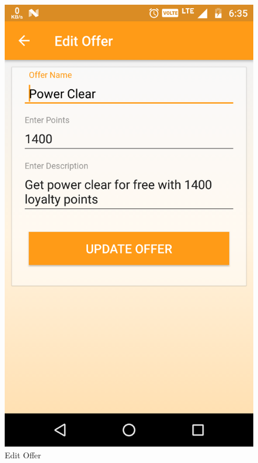 \\
\begin{figure}[h]
	\centering
	\includegraphics[width=0.7\linewidth]{EditOffer}
	\caption{Edit Offer}
\end{figure}
\pagebreak


